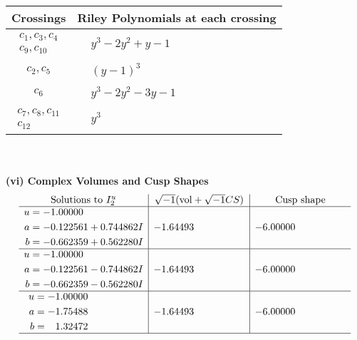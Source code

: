 \documentclass[1p]{elsarticle_modified}
\theoremstyle{definition}
\newcommand{\I}{\sqrt{-1}}
\begin{document}
\begin{tabular}{m{50pt}|m{274pt}}
Crossings & \hspace{64pt}Riley Polynomials at each crossing \\
\hline $$\begin{aligned}c_{1},c_{3},c_{4}\\c_{9},c_{10}\end{aligned}$$&$\begin{aligned}
&y^3-2 y^2+y-1
\end{aligned}$\\
\hline $$\begin{aligned}c_{2},c_{5}\end{aligned}$$&$\begin{aligned}
&(y-1)^3
\end{aligned}$\\
\hline $$\begin{aligned}c_{6}\end{aligned}$$&$\begin{aligned}
&y^3-2 y^2-3 y-1
\end{aligned}$\\
\hline $$\begin{aligned}c_{7},c_{8},c_{11}\\c_{12}\end{aligned}$$&$\begin{aligned}
&y^3
\end{aligned}$\\
\hline
\end{tabular}\\~\\
\newpage\flushleft \textbf{(vi) Complex Volumes and Cusp Shapes}
$$\begin{array}{c|c|c}  
\text{Solutions to }I^u_{2}& \I (\text{vol} + \sqrt{-1}CS) & \text{Cusp shape}\\
 \hline 
\begin{aligned}
u &= -1.00000\phantom{ +0.000000I} \\
a &= -0.122561 + 0.744862 I \\
b &= -0.662359 + 0.562280 I\end{aligned}
 & -1.64493\phantom{ +0.000000I} & -6.00000\phantom{ +0.000000I} \\ \hline\begin{aligned}
u &= -1.00000\phantom{ +0.000000I} \\
a &= -0.122561 - 0.744862 I \\
b &= -0.662359 - 0.562280 I\end{aligned}
 & -1.64493\phantom{ +0.000000I} & -6.00000\phantom{ +0.000000I} \\ \hline\begin{aligned}
u &= -1.00000\phantom{ +0.000000I} \\
a &= -1.75488\phantom{ +0.000000I} \\
b &= \phantom{-}1.32472\phantom{ +0.000000I}\end{aligned}
 & -1.64493\phantom{ +0.000000I} & -6.00000\phantom{ +0.000000I}\\
 \hline 
 \end{array}$$\newpage\newpage\renewcommand{\arraystretch}{1}
\end{document}
